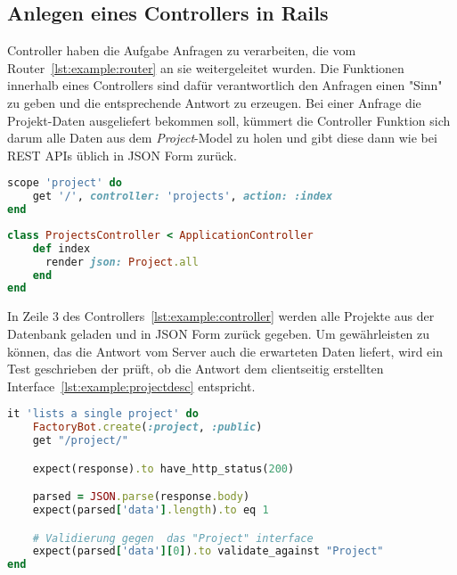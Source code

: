 \subsection{Anlegen eines Controllers in Rails}
\label{sec:requirements:example:controller}
Controller haben die Aufgabe Anfragen zu verarbeiten, die vom Router~\ref{lst:example:router} an sie weitergeleitet wurden.
Die Funktionen innerhalb eines Controllers sind dafür verantwortlich den Anfragen einen "Sinn" zu geben und die entsprechende Antwort zu erzeugen.
Bei einer Anfrage die Projekt-Daten ausgeliefert bekommen soll, kümmert die Controller Funktion sich darum alle Daten aus dem \emph{Project}-Model
zu holen und gibt diese dann wie bei REST APIs üblich in JSON Form zurück.

\begin{lstlisting}[language=Ruby,float=h!,caption={Route entspricht URL '/project/' und leitet Anfrage an die ProjectsController Funktion \emph{index} weiter }, label={lst:example:router}]
scope 'project' do
    get '/', controller: 'projects', action: :index
end
\end{lstlisting}

\begin{lstlisting}[language=Ruby,float=h!,caption={Controller mit Funktion zum zurückgeben aller Project Instanzen}, label={lst:example:controller}]
class ProjectsController < ApplicationController
    def index
      render json: Project.all
    end
end
\end{lstlisting}

In Zeile 3 des Controllers~\ref{lst:example:controller} werden alle Projekte aus der Datenbank geladen und in JSON Form
zurück gegeben. Um gewährleisten zu können, das die Antwort vom Server auch die erwarteten Daten liefert, wird ein
Test geschrieben der prüft, ob die Antwort dem clientseitig erstellten Interface~\ref{lst:example:projectdesc} entspricht.

\begin{lstlisting}[language=Ruby,float=h!,caption={Test überprüft, ob bei Anfrage der Route '/project/' eine Antwort vom Typ Project folgt}, label={lst:example:controller-test}]
it 'lists a single project' do
    FactoryBot.create(:project, :public)
    get "/project/"

    expect(response).to have_http_status(200)

    parsed = JSON.parse(response.body)
    expect(parsed['data'].length).to eq 1

    # Validierung gegen  das "Project" interface
    expect(parsed['data'][0]).to validate_against "Project"
end
\end{lstlisting}

